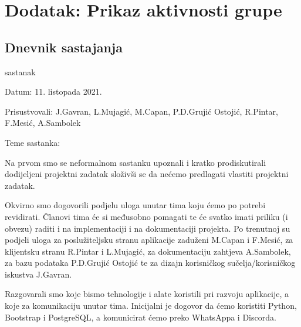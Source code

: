 \chapter*{Dodatak: Prikaz aktivnosti grupe}
		
		\section*{Dnevnik sastajanja}
		
		\begin{packed_enum}
			\item  sastanak
			
			\item[] \begin{packed_item}
				\item Datum: 11. listopada 2021.
				\item Prisustvovali: J.Gavran, L.Mujagić, M.Capan, P.D.Grujić Ostojić, R.Pintar, F.Mesić, A.Sambolek 
				\item Teme sastanka:
				\begin{packed_item}
					\item Na prvom smo se neformalnom sastanku upoznali i kratko prodiskutirali dodijeljeni projektni zadatak složivši se da nećemo predlagati vlastiti projektni zadatak.
					
					\item Okvirno smo dogovorili podjelu uloga unutar tima koju ćemo po potrebi revidirati. Članovi tima će si međusobno pomagati te će svatko imati priliku (i obvezu)
					raditi i na implementaciji i na dokumentaciji projekta. Po trenutnoj su podjeli uloga za poslužiteljsku stranu aplikacije zaduženi M.Capan i F.Mesić, za klijentsku
					stranu R.Pintar i L.Mujagić, za dokumentaciju zahtjeva A.Sambolek, za bazu podataka P.D.Grujić Ostojić te za dizajn korisničkog sučelja/korisničkog iskustva J.Gavran.
					
					\item Razgovarali smo koje bismo tehnologije i alate koristili pri razvoju aplikacije, a koje za komunikaciju unutar tima. Inicijalni je dogovor da ćemo koristiti Python,
					Bootstrap i PostgreSQL, a komunicirat ćemo preko WhatsAppa i Discorda.
				\end{packed_item}
			\end{packed_item}
			

\end{packed_enum}
